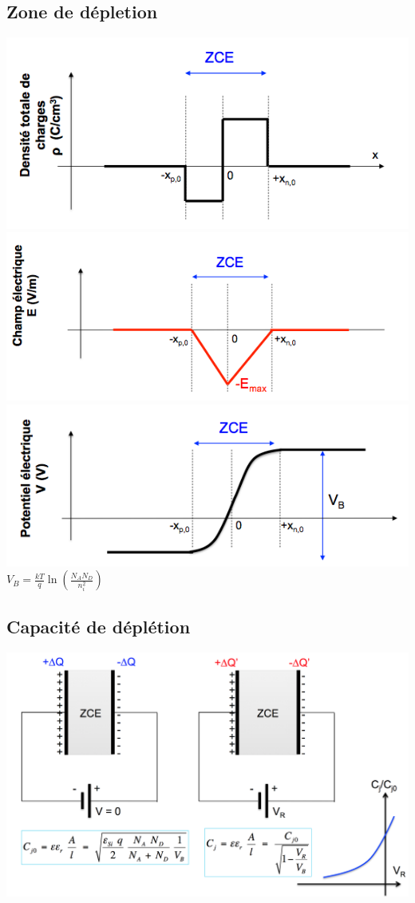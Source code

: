 \documentclass[]{article}
\begin{document}
\subsection{Zone de dépletion}
\includegraphics[scale=0.35]{dcharges}
\includegraphics[scale=0.35]{delec}
\includegraphics[scale=0.4]{pelec}
$ V_B = \frac{kT}{q}\ln{(\frac{N_AN_D}{n_i^2})}$

\subsection{Capacité de déplétion}
\includegraphics[scale=0.3]{capa}
\end{document}
